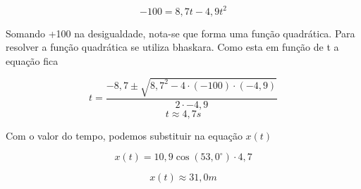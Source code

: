 \documentclass[a4paper, 12pt]{article}
\begin{document}
\begin{flushleft}
		\begin{equation*}
			-100 = 8,7t - 4,9t^2
		\end{equation*}
		
		Somando +100 na desigualdade, nota-se que forma uma função quadrática. Para resolver a função quadrática se utiliza bhaskara. Como esta em função de t a equação fica
		
		\begin{equation*}
			t = \frac{-8,7 \pm \sqrt{8,7^2 - 4 \cdot (-100) \cdot (-4,9)}}{2 \cdot -4,9}
		\end{equation*}
		\begin{equation*}
			t \approx 4,7s	
		\end{equation*}
		
		Com o valor do tempo, podemos substituir na equação $x(t)$
		
		\begin{equation*}
			x(t) = 10,9 \cos(53,0^\circ) \cdot4,7
		\end{equation*}
		
		\begin{equation*}
			x(t) \approx 31,0m	
		\end{equation*}
		
	\end{flushleft}
\end{document}
